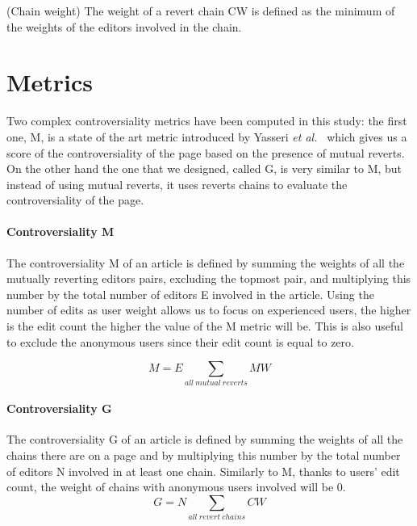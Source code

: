 \begin{Definition}
    (Chain weight) The weight of a revert chain CW is defined as the minimum of the weights of the editors involved in the chain.
\end{Definition}


\section{Metrics}
Two complex controversiality metrics have been computed in this study: the first one, M, is a state of the
art metric introduced by Yasseri \textit{et al.}~\cite{Yasseri2014} which gives us a score of the controversiality of the page
based on the presence of mutual reverts. On the other hand the one that we designed, called G, is very similar to M, but
instead of using mutual reverts, it uses reverts chains to evaluate the controversiality of the page.  

\paragraph*{Controversiality M}
The controversiality M of an article is defined by summing the weights of all the mutually reverting
editors pairs, excluding the topmost pair, and multiplying this number by the total number of
editors E involved in the article. Using the number of edits as user weight allows us to focus on
experienced users, the higher is the edit count the higher the value of the M metric will be. This
is also useful to exclude the anonymous users since their edit count is equal to zero.

\begin{equation}
    M = E   \sum_{all\ mutual\ reverts} MW
\end{equation}

\paragraph*{Controversiality G}
The controversiality G of an article is defined by summing the weights of all the chains
there are on a page and by multiplying this number by the total number of editors N involved in at least one chain.
Similarly to M, thanks to users' edit count, the weight of chains with anonymous users involved will be 0.
\begin{equation}
    G = N \sum_{all\ revert\ chains} CW
\end{equation}




